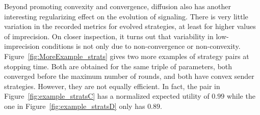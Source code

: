 \documentclass[fleqn,reqno,10pt]{article}
\begin{document}
Beyond promoting convexity and convergence, diffusion also has another interesting regularizing
effect on the evolution of signaling. There is very little variation in the recorded metrics
for evolved strategies, at least for higher values of imprecision. On closer inspection, it
turns out that variability in low-imprecision conditions is not only due to non-convergence or
non-convexity. Figure~\ref{fig:MoreExample_strats} gives two more examples of strategy pairs at
stopping time. Both are obtained for the same triple of parameters, both converged before the
maximum number of rounds, and both have convex sender strategies. However, they are not equally
efficient. In fact, the pair in Figure~\ref{fig:example_stratsC} has a normalized expected
utility of $0.99$ while the one in Figure~\ref{fig:example_stratsD} only has $0.89$.
\end{document}
